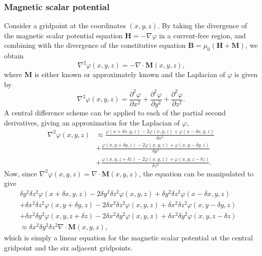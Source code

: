 \subsubsection{Magnetic scalar potential}
Consider a gridpoint at the coordinates \(\left(x,y,z\right)\). By taking the divergence of the magnetic scalar potential equation \(\mathbf{H} = -\nabla \varphi\) in a current-free region, and combining with the divergence of the constitutive equation \(\mathbf{B} = \mu_0 \left( \mathbf{H} + \mathbf{M} \right)\), we obtain
\begin{equation}
    \nabla ^2 \varphi \left(x,y,z\right) = -\nabla \cdot \mathbf{M} \left(x,y,z\right) \text{,}
\end{equation}
where \(\mathbf{M}\) is either known or approximately known and the Laplacian of \(\varphi\) is given by
\begin{equation}
    \nabla ^2 \varphi \left(x,y,z\right) = \frac{\partial ^2 \varphi}{\partial x^2} + \frac{\partial^2 \varphi}{\partial y^2} + \frac{\partial^2 \varphi}{\partial z^2} \text{.}
\end{equation}
A central difference scheme can be applied to each of the partial second derivatives, giving an approximation for the Laplacian of \(\varphi\),
\begin{align}
    \nabla ^2 \varphi \left(x,y,z\right) & \approx \frac{\varphi\left(x+\delta x,y,z\right) - 2\varphi \left(x,y,z\right) + \varphi\left(x-\delta x,y,z\right)}{\delta x^2} \nonumber \\
    & + \frac{\varphi\left(x,y+\delta y,z\right) - 2\varphi \left(x,y,z\right) + \varphi\left(x,y-\delta y,z\right)}{\delta y^2} \\
    & + \frac{\varphi\left(x,y,z+\delta z\right) - 2\varphi \left(x,y,z\right) + \varphi\left(x,y,z-\delta z\right)}{\delta z^2} \text{.} \nonumber
\end{align}
Now, since \(\nabla^2\varphi\left(x,y,z\right) = \nabla \cdot \mathbf{M}\left(x,y,z\right)\), the equation can be manipulated to give
\begin{align}
    \delta y^2 \delta z^2 \varphi \left(x+\delta x,y,z\right) - 2\delta y^2 \delta z^2 \varphi \left(x,y,z\right) + \delta y^2 \delta z^2 \varphi \left(x-\delta x,y,z\right) & \nonumber \\
    + \delta x^2 \delta z^2 \varphi \left(x,y+\delta y,z\right) - 2\delta x^2 \delta z^2 \varphi \left(x,y,z\right) + \delta x^2 \delta z^2 \varphi \left(x,y-\delta y,z\right) & \\
    + \delta x^2 \delta y^2 \varphi \left(x,y,z+\delta z\right) - 2\delta x^2 \delta y^2 \varphi \left(x,y,z\right) + \delta x^2 \delta y^2 \varphi \left(x,y,z-\delta z\right) & \nonumber \\
    \approx \delta x^2 \delta y^2 \delta z^2 \nabla \cdot \mathbf{M} \left(x,y,z\right) \text{,} & \nonumber
\end{align}
which is simply a linear equation for the magnetic scalar potential at the central gridpoint and the six adjacent gridpoints.


